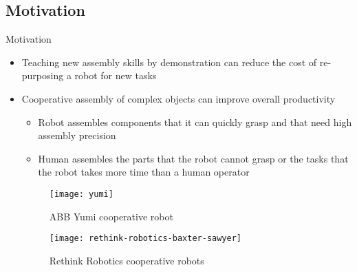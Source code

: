 \subsection{Motivation}
\begin{frame}{Motivation}
	\begin{itemize}
		\item Teaching new assembly skills by demonstration can reduce the cost of re-purposing a robot for new tasks
		\item Cooperative assembly of complex objects can improve overall productivity
		\begin{itemize}
			\item Robot assembles components that it can quickly grasp and that need high assembly precision
			\item Human assembles the parts that the robot cannot grasp or the tasks that the robot takes more time than a human operator
		\end{itemize}
		\begin{figure}[!ht]
			\centering
			\begin{minipage}{.40\textwidth}
				\centering
				\texttt{[image: yumi]}
				\caption{ABB Yumi cooperative robot}
			\end{minipage}%
			\begin{minipage}{0.55\textwidth}
				\centering
				\texttt{[image: rethink-robotics-baxter-sawyer]}
				\caption{Rethink Robotics cooperative robots}
			\end{minipage}
		\end{figure}
	\end{itemize}
\end{frame}


